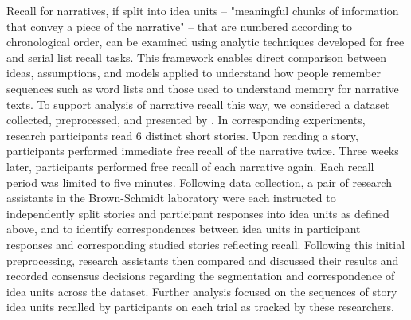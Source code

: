 Recall for narratives, if split into idea units -- "meaningful chunks of information that convey a piece of the narrative" -- that are numbered according to chronological order, can be examined using analytic techniques developed for free and serial list recall tasks. This framework enables direct comparison between ideas, assumptions, and models applied to understand how people remember sequences such as word lists and those used to understand memory for narrative texts. To support analysis of narrative recall this way, we considered a dataset collected, preprocessed, and presented by \citet{cutler2019narrative}. In corresponding experiments, research participants read 6 distinct short stories. Upon reading a story, participants performed immediate free recall of the narrative twice. Three weeks later, participants performed free recall of each narrative again. Each recall period was limited to five minutes. Following data collection, a pair of research assistants in the Brown-Schmidt laboratory were each instructed to independently split stories and participant responses into idea units as defined above, and to identify correspondences between idea units in participant responses and corresponding studied stories reflecting recall. Following this initial preprocessing, research assistants then compared and discussed their results and recorded consensus decisions regarding the segmentation and correspondence of idea units across the dataset. Further analysis focused on the sequences of story idea units recalled by participants on each trial as tracked by these researchers.